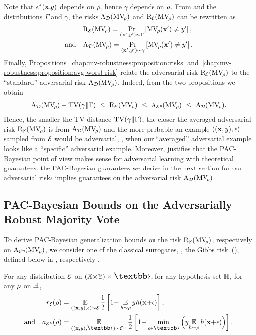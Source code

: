 Note that $\epsilon^*(\mathbf{x}{,}y)$ depends on $\rho$, hence $\gamma$ depends on $\rho$.
From  and the distributions $\Gamma$ and $\gamma$, the risks 
$\text{A}_{\mathcal{D}}(\text{MV}_{\!\rho})$  and $\text{R}_{{\mathcal{E}}}(\text{MV}_{\!\rho})$ can be rewritten as
\begin{align*}
    &\text{R}_{{\mathcal{E}}}(\text{MV}_{\!\rho}) = \Pr_{(\mathbf{x}', y')\sim\Gamma}\left[ \text{MV}_{\!\rho}(\mathbf{x}')\ne y'\right],\\
    \text{and}\quad &\text{A}_{\mathcal{D}}(\text{MV}_{\!\rho}) = \Pr_{(\mathbf{x}',y'){\sim}\gamma}\left[ \text{MV}_{\!\rho}(\mathbf{x}')\ne y'\right].
\end{align*}
Finally, Propositions~\ref{chap:mv-robustness:proposition:risks} and~\ref{chap:mv-robustness:proposition:avg-worst-risk} relate the adversarial risk $\text{R}_{{\mathcal{E}}}(\text{MV}_{\!\rho})$ to the ``standard'' adversarial risk $\text{A}_{\mathcal{D}}(\text{MV}_{\!\rho})$.
Indeed, from the two propositions we obtain
\begin{align}
\label{chap:mv-robustness:eq:merged_prop}
    \RiskA_{\D}(\MVQ) - \TV(\gamma\|\Gamma)\ \le\  \Risk_{\Dpert}(\MVQ)\ \le\  \RiskM_{\Dpert^{n\!}}(\MVQ)\ \le\  \RiskA_{\D}(\MVQ).
\end{align}
Hence, the smaller the TV distance ${\rm TV}(\gamma\|\Gamma)$, the closer the averaged adversarial risk $\text{R}_{{\mathcal{E}}}(\text{MV}_{\!\rho})$ is from $\text{A}_{\mathcal{D}}(\text{MV}_{\!\rho})$ and the more probable an example $((\mathbf{x},y),\epsilon)$ sampled from ${\mathcal{E}}$ would be adversarial, \ie,
when our ``averaged'' adversarial example looks like a ``specific'' adversarial example.
Moreover,  justifies that the PAC-Bayesian point of view makes sense for adversarial learning with theoretical guarantees: the PAC-Bayesian guarantees we derive in the next section for our adversarial risks implies guarantees on the adversarial risk $\text{A}_{\mathcal{D}}(\text{MV}_{\!\rho})$.

\subsection{PAC-Bayesian Bounds on the Adversarially Robust Majority Vote}
\label{chap:mv-robustness:sec:bound}

To derive PAC-Bayesian generalization bounds on the risk $\text{R}_{{\mathcal{E}}}(\text{MV}_{\!\rho})$, respectively on $\text{A}_{{\mathcal{E}}^{n\!}}(\text{MV}_{\!\rho})$, we consider one of the classical surrogates, \ie, the Gibbs risk~(), defined below in , respectively .

\begin{definition} For any distribution ${\mathcal{E}}$ on $(\X{\times}\Y)\times\Epert$, for any hypothesis set $\mathbb{H}$, for any $\rho$ on $\mathbb{H}$,  
\begin{align}
  \RiskS_{\Dpert}(\Q) &= \EE_{((\x,\y),\epsilon)\sim\Dpert} \frac{1}{2}\left[ 1 {-}  \EE_{\h\sim\Q} \y\h(\x{+}\epsilon) \right],\label{chap:pac-bayes:eq:gibbs}\\ 
    \text{and}\quad
    \RiskMS_{\Dpert^{n}}(\Q) &= \EE_{((\x,\y),\Epert)\sim\Dpert^{n}} \frac{1}{2}\left[ 1{-}\min_{\epsilon\in\Epert} \Big( \y\! \EE_{\h\sim\Q} \h(\x{+}\epsilon)\Big)\right].\label{chap:pac-bayes:eq:gibbs-max}
\end{align}
\end{definition}

